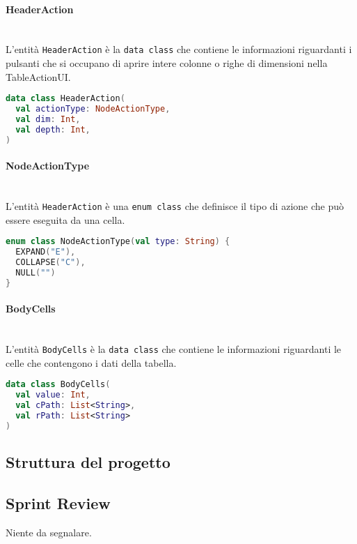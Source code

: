 \paragraph*{HeaderAction} \mbox{} \\
L'entità \verb|HeaderAction| è la \verb|data class| che contiene le informazioni riguardanti i pulsanti che si occupano di aprire intere colonne o righe di dimensioni nella TableActionUI.
\begin{lstlisting}[caption={HeaderAction}, label={lst:headeraction}, language=Kotlin]
data class HeaderAction(
  val actionType: NodeActionType,
  val dim: Int,
  val depth: Int,
)
\end{lstlisting}

\paragraph*{NodeActionType} \mbox{} \\
L'entità \verb|HeaderAction| è una \verb|enum class| che definisce il tipo di azione che può essere eseguita da una cella.
\begin{lstlisting}[caption={NodeActionType}, label={lst:nodeactiontype}, language=Kotlin]
enum class NodeActionType(val type: String) {
  EXPAND("E"),
  COLLAPSE("C"),
  NULL("")
}
\end{lstlisting}

\paragraph*{BodyCells} \mbox{} \\
L'entità \verb|BodyCells| è la \verb|data class| che contiene le informazioni riguardanti le celle che contengono i dati della tabella.
\begin{lstlisting}[caption={BodyCells}, label={lst:bodycells}, language=Kotlin]
data class BodyCells(
  val value: Int,
  val cPath: List<String>,
  val rPath: List<String>
)
\end{lstlisting}

\subsection{Struttura del progetto}
\subsection{Sprint Review}
Niente da segnalare.

